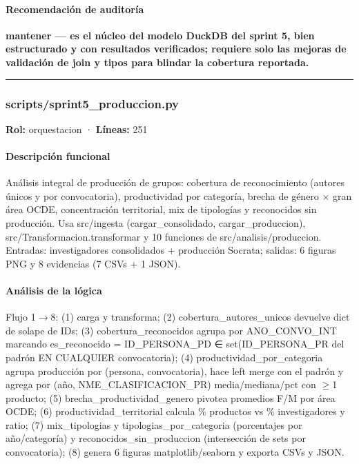 \begin{tcolorbox}[riesgo]
\begin{itemize}
\end{itemize}
\end{tcolorbox}

\paragraph{Recomendación de auditoría}
\textbf{mantener --- es el núcleo del modelo DuckDB del sprint 5, bien estructurado y con resultados verificados; requiere solo las mejoras de validación de join y tipos para blindar la cobertura reportada.}

\medskip
\hrule

\subsubsection{scripts/sprint5\_produccion.py}
\textbf{Rol:} orquestacion · \textbf{Líneas:} 251

\paragraph{Descripción funcional}
Análisis integral de producción de grupos: cobertura de reconocimiento (autores únicos y por convocatoria), productividad por categoría, brecha de género $\times$ gran área OCDE, concentración territorial, mix de tipologías y reconocidos sin producción. Usa src/ingesta (cargar\_consolidado, cargar\_produccion), src/Transformacion.transformar y 10 funciones de src/analisis/produccion. Entradas: investigadores consolidados + producción Socrata; salidas: 6 figuras PNG y 8 evidencias (7 CSVs + 1 JSON).

\paragraph{Análisis de la lógica}
Flujo 1$\rightarrow$8: (1) carga y transforma; (2) cobertura\_autores\_unicos devuelve dict de solape de IDs; (3) cobertura\_reconocidos agrupa por ANO\_CONVO\_INT marcando es\_reconocido = ID\_PERSONA\_PD ∈ set(ID\_PERSONA\_PR del padrón EN CUALQUIER convocatoria); (4) productividad\_por\_categoria agrupa producción por (persona, convocatoria), hace left merge con el padrón y agrega por (año, NME\_CLASIFICACION\_PR) media/mediana/pct con $\geq$1 producto; (5) brecha\_productividad\_genero pivotea promedios F/M por área OCDE; (6) productividad\_territorial calcula \% productos vs \% investigadores y ratio; (7) mix\_tipologias y tipologias\_por\_categoria (porcentajes por año/categoría) y reconocidos\_sin\_produccion (intersección de sets por convocatoria); (8) genera 6 figuras matplotlib/seaborn y exporta CSVs y JSON.

